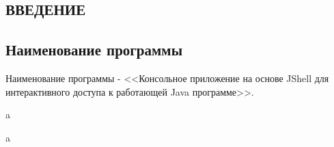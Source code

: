 \pagestyle{fancy}




\begin{center}
	\section{ВВЕДЕНИЕ}
\end{center}	


\subsection{Наименование программы} 
	
\large
Наименование программы - <<Консольное приложение на основе JShell для интерактивного доступа к работающей Java программе>>.
	
a
	
a
	

